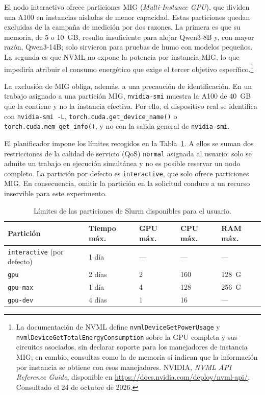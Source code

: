 El nodo interactivo ofrece particiones MIG (\textit{Multi-Instance GPU}), que dividen una A100 en instancias aisladas de menor capacidad. Estas particiones quedan excluidas de la campaña de medición por dos razones. La primera es que su memoria, de 5 o 10~GB, resulta insuficiente para alojar Qwen3-8B y, con mayor razón, Qwen3-14B; solo sirvieron para pruebas de humo con modelos pequeños. La segunda es que NVML no expone la potencia por instancia MIG, lo que impediría atribuir el consumo energético que exige el tercer objetivo específico.\footnote{La documentación de NVML define \texttt{nvmlDeviceGetPowerUsage} y \texttt{nvmlDeviceGetTotalEnergyConsumption} sobre la GPU completa y sus circuitos asociados, sin declarar soporte para los manejadores de instancia MIG; en cambio, consultas como la de memoria sí indican que la información por instancia se obtiene con esos manejadores. NVIDIA, \textit{NVML API Reference Guide}, disponible en \url{https://docs.nvidia.com/deploy/nvml-api/}. Consultado el 24 de octubre de 2026.}

La exclusión de MIG obliga, además, a una precaución de identificación. En un trabajo asignado a una partición MIG, \texttt{nvidia-smi} muestra la A100 de 40~GB que la contiene y no la instancia efectiva. Por ello, el dispositivo real se identifica con \texttt{nvidia-smi -L}, \texttt{torch.cuda.\allowbreak get\_device\_name()} o \texttt{torch.cuda.\allowbreak mem\_get\_info()}, y no con la salida general de \texttt{nvidia-smi}.

El planificador impone los límites recogidos en la Tabla~\ref{tab:cap2:slurm}. A ellos se suman dos restricciones de la calidad de servicio (QoS) \texttt{normal} asignada al usuario: solo se admite un trabajo en ejecución simultánea y no es posible reservar un nodo completo. La partición por defecto es \texttt{interactive}, que solo ofrece particiones MIG. En consecuencia, omitir la partición en la solicitud conduce a un recurso inservible para este experimento.

\begin{table}[htbp]
  \centering
  \caption{Límites de las particiones de Slurm disponibles para el usuario.}
  \label{tab:cap2:slurm}
  \small
  \begin{tabular}{|p{}|p{}|p{}|p{}|p{}|}
    \hline
    \textbf{Partición} & \textbf{Tiempo máx.} & \textbf{GPU máx.} & \textbf{CPU máx.} & \textbf{RAM máx.} \\
    \hline
    \texttt{interactive} (por defecto) & 1 día & --- & --- & --- \\
    \hline
    \texttt{gpu} & 2 días & 2 & 160 & 128~G \\
    \hline
    \texttt{gpu-max} & 1 día & 4 & 128 & 256~G \\
    \hline
    \texttt{gpu-dev} & 4 días & 1 & 16 & --- \\
    \hline
  \end{tabular}
\end{table}

